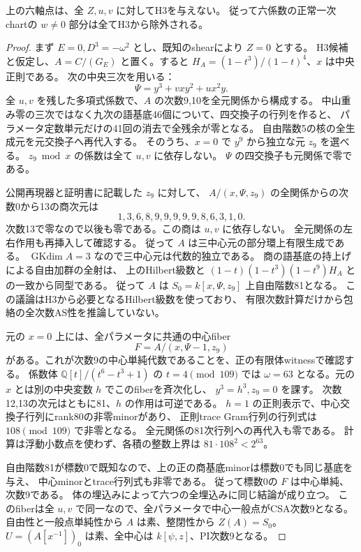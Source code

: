 \begin{theorem}[六軸点の全切断排除]
\label{thm:cubic-third-root-unit-boundary-axes-no-H3}
上の六軸点は、全 $Z,u,v$ に対してH3を与えない。
従って六係数の正常一次chartの $w\ne0$ 部分は全てH3から除外される。
\end{theorem}
\begin{proof}
まず $E=0,D^3=-\omega^2$ とし、既知のshearにより $Z=0$ とする。
H3候補と仮定し、$A=C/(G_E)$ と置く。すると
$H_A=(1-t^3)/(1-t)^4$、$x$ は中央正則である。
次の中央三次を用いる：
\[
 \Psi=y^3+vxy^2+ux^2y.
\]
全 $u,v$ を残した多項式係数で、$A$ の次数9,10を全元関係から構成する。
中山重み零の三次ではなく九次の語基底46個について、四交換子の行列を作ると、
パラメータ定数単元だけの41回の消去で全残余が零となる。
自由階数5の核の全生成元を元交換子へ再代入する。
そのうち、$x=0$ で $y^9$ から独立な元 $z_9$ を選べる。
$z_9\bmod x$ の係数は全て $u,v$ に依存しない。
$\Psi$ の四交換子も元関係で零である。

公開再現器と証明書に記載した $z_9$ に対して、
$A/(x,\Psi,z_9)$ の全関係からの次数0から13の商次元は
\[
 1,3,6,8,9,9,9,9,9,8,6,3,1,0.
\]
次数13で零なので以後も零である。この商は $u,v$ に依存しない。
全元関係の左右作用も再挿入して確認する。
従って $A$ は三中心元の部分環上有限生成である。
$\operatorname{GKdim}A=3$ なので三中心元は代数的独立である。
商の語基底の持上げによる自由加群の全射は、
上のHilbert級数と
$(1-t)(1-t^3)(1-t^9)H_A$
との一致から同型である。
従って $A$ は $S_0=k[x,\Psi,z_9]$ 上自由階数81となる。
この議論はH3から必要となるHilbert級数を使っており、
有限次数計算だけから包絡の全次数AS性を推論していない。

元の $x=0$ 上には、全パラメータに共通の中心fiber
\[
 F=A/(x,\Psi-1,z_9)
\]
がある。これが次数9の中心単純代数であることを、正の有限体witnessで確認する。
係数体 $\mathbb Q[t]/(t^6-t^3+1)$ の $t=4\pmod {109}$ では
$\omega=63$ となる。元の $x$ とは別の中央変数 $h$ でこのfiberを斉次化し、
$y^3=h^3,z_9=0$ を課す。
次数12,13の次元はともに81、$h$ の作用は可逆である。
$h=1$ の正則表示で、中心交換子行列にrank80の非零minorがあり、
正則trace Gram行列の行列式は $108\pmod {109}$ で非零となる。
全元関係の81次行列への再代入も零である。
計算は浮動小数点を使わず、各積の整数上界は $81\cdot108^2<2^{63}$。

自由階数81が標数0で既知なので、上の正の商基底minorは標数0でも同じ基底を与え、
中心minorとtrace行列式も非零である。
従って標数0の $F$ は中心単純、次数9である。
体の埋込みによって六つの全埋込みに同じ結論が成り立つ。
このfiberは全 $u,v$ で同一なので、全パラメータで中心一般点がCSA次数9となる。
自由性と一般点単純性から $A$ は素、整閉性から $Z(A)=S_0$。
$U=(A[x^{-1}])_0$ は素、全中心は $k[\psi,z]$、PI次数9となる。


\end{proof}
